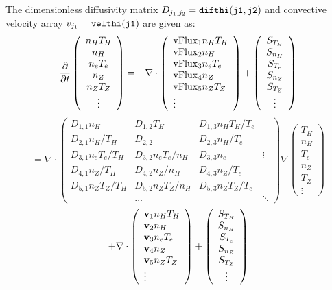 The dimensionless diffusivity matrix $ D_{j_1,j_2} = {\tt difthi(j1,j2)}$
and convective velocity array $ v_{j_1} = {\tt velthi(j1)} $
are given as:
$$ \frac{\partial}{\partial t}
 \left( \begin{array}{c} n_H T_H  \\ n_H \\ n_e T_e \\
    n_Z \\ n_Z T_Z \\ \vdots
    \end{array} \right)
 = - \nabla \cdot
\left( \begin{array}{l} {\rm vFlux}_1 n_H T_H \\
 {\rm vFlux}_2 n_H \\
 {\rm vFlux}_3 n_e T_e \\
 {\rm vFlux}_4 n_Z \\
 {\rm vFlux}_5 n_Z T_Z \\
 \vdots \end{array} \right) 
 + \left( \begin{array}{c} S_{T_H} \\ S_{n_H} \\ S_{T_e} \\
    S_{n_Z} \\ S_{T_Z} \\ \vdots
    \end{array} \right)
$$
$$
 = \nabla \cdot
\left( \begin{array}{llll}
D_{1,1} n_H & D_{1,2} T_H & D_{1,3} n_H T_H / T_e \\
D_{2,1} n_H / T_H & D_{2,2} & D_{2,3} n_H / T_e \\
D_{3,1} n_e T_e / T_H & D_{3,2} n_e T_e / n_H & D_{3,3} n_e & \vdots \\
D_{4,1} n_Z / T_H & D_{4,2} n_Z / n_H & D_{4,3} n_Z / T_e \\
D_{5,1} n_Z T_Z / T_H & D_{5,2} n_Z T_Z / n_H &
        D_{5,3} n_Z T_Z / T_e \\
 & \ldots & & \ddots
\end{array} \right)
 \nabla
 \left( \begin{array}{c}  T_H \\ n_H \\  T_e \\
   n_Z \\  T_Z \\ \vdots
    \end{array} \right)
$$
$$
 + \nabla \cdot
\left( \begin{array}{l} {\bf v}_1 n_H T_H \\ {\bf v}_2 n_H \\
   {\bf v}_3 n_e T_e \\
   {\bf v}_4 n_Z \\ {\bf v}_5 n_Z T_Z \\ \vdots \end{array} \right) +
 \left( \begin{array}{c} S_{T_H} \\ S_{n_H} \\ S_{T_e} \\
    S_{n_Z} \\ S_{T_Z} \\ \vdots
    \end{array} \right) $$
